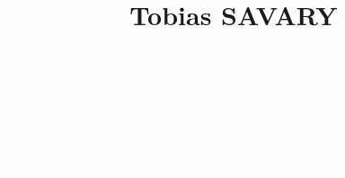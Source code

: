 \documentclass[9pt, oneside, a4paper, titlepage]{extarticle}
\title{Tobias SAVARY}
\date{}
\begin{document}
    \begin{tcolorbox}
        \begin{minipage}{0.3\linewidth}
            \hspace*{1cm} %
        \end{minipage}%
        \hspace{1cm}%
        \begin{minipage}{0.5\linewidth}
            \begin{center}
                \Huge{\textcolor{white}{Tobias SAVARY}} \\
                \vspace*{0.5cm}
                \Large{\textcolor{white}{Looking for a 6-month internship as an \\engineer assistant in September 2023 \\
                \vspace*{0.5cm}
                \Large{\textcolor{white}{\emph{Student in Engeneering, Computer Science \\University of Technology of Compiègne (UTC) \\}}}
                }}
            \end{center}
        \end{minipage}%
    \end{tcolorbox}
\end{document}
